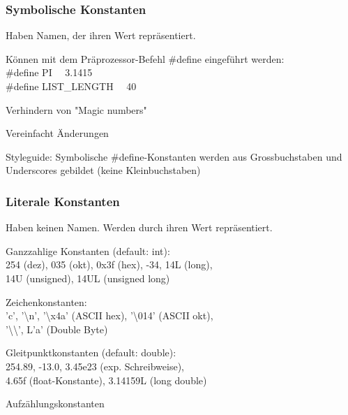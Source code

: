 	 		\begin{minipage}[t]{8 cm}
		 		\subsubsection{Symbolische Konstanten}
		 			Haben Namen, der ihren Wert repräsentiert.
		 			\begin{compactitem}
		 				\item Können mit dem Präprozessor-Befehl \#define eingeführt werden:\\
		 				\#define PI \ \ 3.1415\\
		 				\#define LIST\_LENGTH \ \ 40
		 				\item Verhindern von "Magic numbers"
		 				\item Vereinfacht Änderungen
		 				\item Styleguide: Symbolische \#define-Konstanten werden aus Grossbuchstaben und Underscores gebildet (keine Kleinbuchstaben) 			 	
		 			\end{compactitem}
		 	\end{minipage}
		 	\hspace*{1.0 cm}
		 	\begin{minipage}[t]{9 cm}
 				\subsubsection{Literale Konstanten}
 					Haben keinen Namen. Werden durch ihren Wert repräsentiert.
 					\begin{compactitem}
	 					\item Ganzzahlige Konstanten (default: int):\\
	 					254 (dez), 035 (okt), 0x3f (hex), -34, 14L (long),\\ 14U (unsigned), 14UL (unsigned long)
	 					\item Zeichenkonstanten:\\
	 					'c', '\textbackslash n', '\textbackslash x4a' (ASCII hex), '\textbackslash014' (ASCII okt), \\'\textbackslash \textbackslash', L'a' (Double Byte)
	 					\item Gleitpunktkonstanten (default: double):\\
	 					254.89, -13.0, 3.45e23 (exp. Schreibweise), \\ 4.65f (float-Konstante),  3.14159L (long double)
	 					\item Aufzählungskonstanten		 				 			 	
 					\end{compactitem}
 			\end{minipage}
